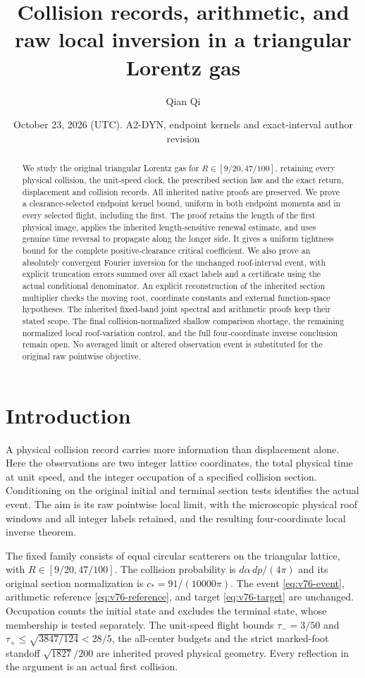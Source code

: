 \documentclass[11pt,reqno]{amsart}
\title[Collision records and raw local inversion]{Collision records, arithmetic, and raw local inversion in a triangular Lorentz gas}
\author{Qian Qi}
\date{October 23, 2026 (UTC). A2-DYN, endpoint kernels and exact-interval author revision}
\numberwithin{equation}{section}
\theoremstyle{definition}\newtheorem{definition}[theorem]{Definition}
\theoremstyle{remark}\newtheorem{remark}[theorem]{Remark}
\begin{document}
\raggedbottom
\begin{abstract}
We study the original triangular Lorentz gas for
$R\in[9/20,47/100]$, retaining every physical collision, the
unit-speed clock, the prescribed section law and the exact
return, displacement and collision records. All inherited native
proofs are preserved. We prove a clearance-selected endpoint
kernel bound, uniform in both endpoint momenta and in every
selected flight, including the first. The proof retains the
length of the first physical image, applies the inherited
length-sensitive renewal estimate, and uses genuine time reversal
to propagate along the longer side. It gives a uniform tightness
bound for the complete positive-clearance critical coefficient.
We also prove an absolutely convergent Fourier inversion for the
unchanged roof-interval event, with explicit truncation errors
summed over all exact labels and a certificate using the actual
conditional denominator. An explicit reconstruction of the
inherited section multiplier checks the moving root, coordinate
constants and external function-space hypotheses. The inherited
fixed-band joint spectral and arithmetic proofs keep their stated
scope. The final collision-normalized shallow comparison shortage,
the remaining normalized local roof-variation control, and
the full four-coordinate inverse conclusion
remain open. No averaged limit or altered observation event is
substituted for the original raw pointwise objective.
\end{abstract}
\maketitle
\tableofcontents

\section*{Introduction}
A physical collision record carries more information than displacement
alone. Here the observations are two integer lattice coordinates, the
total physical time at unit speed, and the integer occupation of a
specified collision section. Conditioning on the original initial
and terminal section tests identifies the actual event. The aim is
its raw pointwise local limit, with the microscopic physical roof
windows and all integer labels retained, and the resulting
four-coordinate local inverse theorem.

The fixed family consists of equal circular scatterers on the
triangular lattice, with $R\in[9/20,47/100]$. The collision probability
is $d\alpha\,dp/(4\pi)$ and its original section normalization is
$c_*=91/(10000\pi)$. The event \eqref{eq:v76-event}, arithmetic
reference \eqref{eq:v76-reference}, and target \eqref{eq:v76-target}
are unchanged. Occupation counts the initial state and excludes
the terminal state, whose membership is tested separately.
The unit-speed flight bounds
$\tau_-=3/50$ and $\tau_+\le\sqrt{3847/124}<28/5$, the all-center
budgets and the strict marked-foot standoff $\sqrt{1827}/200$
are inherited proved physical geometry. Every reflection in the
argument is an actual first collision.
\end{document}
